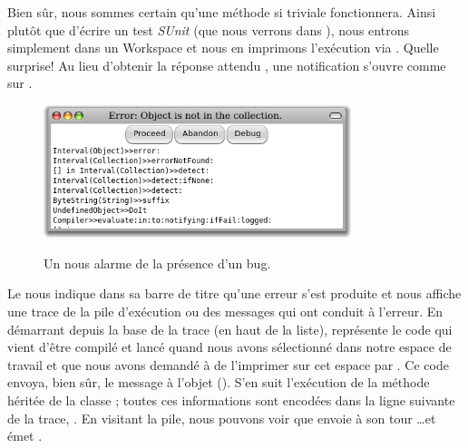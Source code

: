\documentclass[a4paper,10pt,twoside]{book}
\begin{document}
Bien sûr, nous sommes certain qu'une méthode si triviale fonctionnera.
Ainsi plutôt que d'écrire un test \emph{SUnit} 
(que nous verrons dans ),
nous entrons simplement  dans un Workspace
et nous en imprimons l'exécution via .
Quelle surprise! Au lieu d'obtenir la réponse attendu , 
une notification  s'ouvre comme sur
.

\begin{figure}[btp]
	\begin{center}
		{\includegraphics[width=0.8\textwidth]{PreDebugWindow}}
	\end{center}
	\caption{Un  nous alarme de la présence d'un bug.}
\end{figure}

Le  nous indique dans sa barre de titre
qu'une erreur s'est produite et nous affiche une trace de la pile d'exécution
ou  des messages qui ont conduit à l'erreur.
En démarrant depuis la base de la trace
(en haut de la liste),
  représente le code qui vient d'être compilé
et lancé quand nous avons sélectionné  
dans notre espace de travail et que nous avons
demandé à \pharo de l'imprimer sur cet espace par .
Ce code envoya, bien sûr, le message  à
l'objet  ().
S'en suit l'exécution de la méthode  héritée de la
classe ;
toutes ces informations sont encodées dans la ligne suivante de la trace,
.
En visitant la pile, nous pouvons voir que  envoie
à son tour \ldots et  émet .
\end{document}

